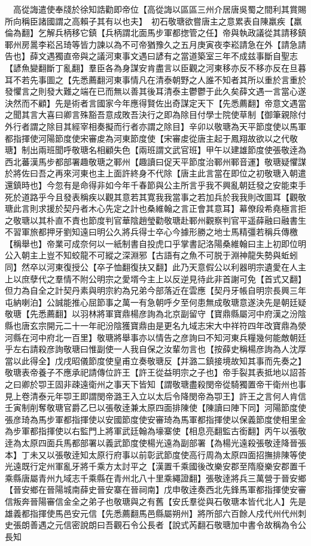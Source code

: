 　高從誨遣使奉牋於徐知誥勸即帝位【高從誨以區區三州介居唐吳蜀之間利其賞賜所向稱臣諸國謂之高賴子其有以也夫】　初石敬瑭欲嘗唐主之意累表自陳羸疾【羸倫為翻】乞解兵柄移它鎮【兵柄謂北面馬步軍都揔管之任】帝與執政議從其請移鎮鄆州房暠李崧呂琦等皆力諫以為不可帝猶豫久之五月庚寅夜李崧請急在外【請急請告也】薛文遇獨直帝與之議河東事文遇曰諺有之當道築室三年不成兹事斷自聖志【諺魚變翻斷丁亂翻】羣臣各為身謀安肯盡言以臣觀之河東移亦反不移亦反在旦暮耳不若先事圖之【先悉薦翻河東事情凡在清泰朝野之人誰不知者其所以重於言重於發懼言之則發大難之端在已而無以善其後耳清泰主鬱鬱于此久矣薛文遇一言當心遂決然而不顧】先是術者言國家今年應得賢佐出奇謀定天下【先悉薦翻】帝意文遇當之聞其言大喜曰卿言殊豁吾意成敗吾決行之即為除目付學士院使草制【御筆親除付外行者謂之除目其經宰相奏擬而行者亦謂之除目】辛卯以敬瑭為天平節度使以馬軍都指揮使河陽節度使宋審䖍為河東節度使【宋審䖍從唐主起于鳳翔故欲以之代敬瑭】制出兩班聞呼敬瑭名相顧失色【兩班謂文武官班】甲午以建雄節度使張敬逹為西北蕃漢馬步都部署趣敬瑭之鄆州【趣讀曰促天平節度治鄆州鄆音運】敬瑭疑懼謀於將佐曰吾之再來河東也主上面許終身不代除【唐主此言當在即位之初敬瑭入朝遣還鎮時也】今忽有是命得非如今年千春節與公主所言乎我不興亂朝廷發之安能束手死於道路乎今且發表稱疾以觀其意若其寛我我當事之若加兵於我我則改圖耳【觀敬瑭此言則求援於契丹者木心先定之計也桑維翰之言正會其意耳】幕僚段希堯極言拒之敬瑭以其朴直不責也節度判官華陰趙瑩勸敬瑭赴鄆州觀察判官平遥薛融曰融書生不習軍旅都押牙劉知遠曰明公久將兵得士卒心今據形勝之地士馬精彊若稱兵傳檄【稱舉也】帝業可成奈何以一紙制書自投虎口乎掌書記洛陽桑維翰曰主上初即位明公入朝主上豈不知蛟龍不可縱之深淵邪【古語有之魚不可脱于淵神龍失勢與蚯蚓同】然卒以河東復授公【卒子恤翻復扶又翻】此乃天意假公以利器明宗遺愛在人主上以庶孽代之羣情不附公明宗之愛壻今主上以反逆見待此非首謝可免【首式又翻】但力為自全之計契丹素與明宗約為兄弟今部落近在雲應【契丹牙帳自明宗長興三年屯納喇泊】公誠能推心屈節事之萬一有急朝呼夕至何患無成敬瑭意遂決先是朝廷疑敬瑭【先悉薦翻】以羽林將軍寶鼎楊彦詢為北京副留守【寶鼎縣屬河中府漢之汾陰縣也唐玄宗開元二十一年祀汾陰獲寶鼎由是更名九域志宋大中祥符四年改寶鼎為滎河縣在河中府北一百里】敬瑭將舉事亦以情告之彦詢曰不知河東兵糧幾何能敵朝廷乎左右請殺彦詢敬瑭曰惟副使一人我自保之汝輩勿言也【按薛史稱楊彦詢為人沈厚當以此得全】戊戌昭儀節度使皇甫立奏敬瑭反【并潞二鎮接境故知其事而先奏之】敬瑭表帝養子不應承祀請傳位許王【許王從益明宗之子也】帝手裂其表抵地以詔荅之曰卿於卾王固非疎遠衛州之事天下皆知【謂敬瑭盡殺閔帝從騎獨置帝干衛州也事見上卷清泰元年卾王即謂閔帝潞王入立以太后令降閔帝為卾王】許王之言何人肯信壬寅制削奪敬瑭官爵乙巳以張敬逹兼太原四面排陳使【陳讀曰陣下同】河陽節度使張彦琦為馬步軍都指揮使以安國節度使安審琦為馬軍都指揮使以保義節度使相里金為步軍都指揮使以右監門上將軍武廷翰為壕寨使【相息亮翻監古銜翻】丙午以張敬逹為太原四面兵馬都部署以義武節度使楊光遠為副部署【為楊光遠殺張敬逹降晉張本】丁未又以張敬逹知太原行府事以前彰武節度使高行周為太原四面招撫排陳等使光遠既行定州軍亂牙將千乘方太討平之【漢置千乘國後改樂安郡至隋廢樂安郡置千乘縣唐屬青州九域志千乘縣在青州北八十里乘繩證翻】張敬逹將兵三萬營于晉安鄉【晉安鄉在晉陽城南薛史晉安寨在晉祠南】戊申敬逹奏西北先鋒馬軍都指揮使安審信叛奔晉陽審信金全之弟子也敬瑭與之有舊【安氏羣從與石敬瑭本皆代北人】先是雄義都指揮使馬邑安元信【先悉薦翻馬邑縣屬朔州】將所部六百餘人戍代州代州刺史張朗善遇之元信密說朗曰吾觀石令公長者【說式芮翻石敬瑭加中書令故稱為令公長知